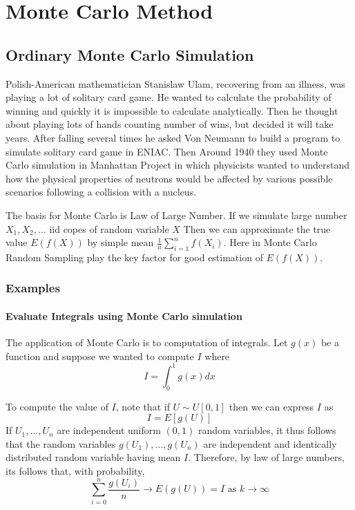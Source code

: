 \chapter{Monte Carlo Method}


\section{Ordinary Monte Carlo Simulation}

Polish-American mathematician Stanislaw Ulam, recovering from an illness, was playing a lot of
solitary card game. He wanted to calculate the probability of winning and
quickly it is impossible to calculate analytically. Then he thought about playing
lots of hands counting number of wins, but decided it will take years.
After falling several times he asked Von Neumann to build a program to simulate solitary
card game in ENIAC. Then Around 1940 they used Monte Carlo simulation in Manhattan Project
in which physicists wanted to understand how the physical
properties of neutrons would be affected by various possible scenarios following a
collision with a nucleus.

The basis for Monte Carlo is Law of Large Number. If we simulate large number $X_1, X_2, \ldots$ iid
copes of random variable $X$ Then we can approximate the true value $E(f(X))$ by simple mean
$\frac{1}{n}\sum_{i=1}^{n} f(X_i)$. Here in Monte Carlo Random Sampling play the key factor for good estimation of $E(f(X))$.


\subsection{Examples}
\subsubsection{Evaluate Integrals using Monte Carlo simulation}
The application of Monte Carlo is to computation of integrals. Let $g(x)$ be a function
and suppose we wanted to compute $I$ where
\[
	I = \int_{0}^{1} g(x) dx
\]

To compute the value of $I$, note that if $U\sim U[0,1]$ then we can express $I$ as
\[
	I = E[g(U)]
\]
If $U_1, \ldots, U_n$ are independent uniform $(0,1)$ random variables, it thus follows that
the random variables $g(U_1),\ldots,g(U_n)$ are independent and identically distributed random
variable having mean $I$. Therefore, by law of large numbers, its follows that,
with probability,
\[
	\sum_{i = 0}^{n} \frac{g(U_i)}{n} \to E(g(U))= I \text{ as } k \to \infty
\]

